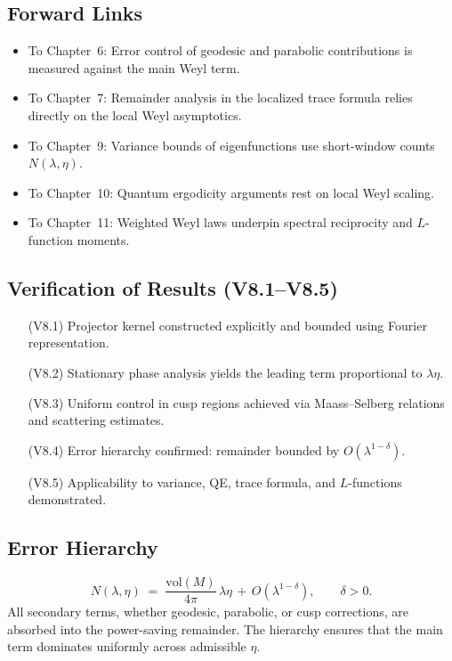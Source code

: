 \subsection*{Forward Links}
\begin{itemize}
  \item To Chapter~6: Error control of geodesic and parabolic contributions is measured against the main Weyl term.
  \item To Chapter~7: Remainder analysis in the localized trace formula relies directly on the local Weyl asymptotics.
  \item To Chapter~9: Variance bounds of eigenfunctions use short-window counts $N(\lambda,\eta)$.
  \item To Chapter~10: Quantum ergodicity arguments rest on local Weyl scaling.
  \item To Chapter~11: Weighted Weyl laws underpin spectral reciprocity and $L$-function moments.
\end{itemize}

\subsection*{Verification of Results (V8.1–V8.5)}
\begin{itemize}
  \item[(V8.1)] Projector kernel constructed explicitly and bounded using Fourier representation.
  \item[(V8.2)] Stationary phase analysis yields the leading term proportional to $\lambda\eta$.
  \item[(V8.3)] Uniform control in cusp regions achieved via Maass–Selberg relations and scattering estimates.
  \item[(V8.4)] Error hierarchy confirmed: remainder bounded by $O(\lambda^{1-\delta})$.
  \item[(V8.5)] Applicability to variance, QE, trace formula, and $L$-functions demonstrated.
\end{itemize}

\subsection*{Error Hierarchy}
\[
  N(\lambda,\eta) \;=\; \frac{\mathrm{vol}(M)}{4\pi}\,\lambda\eta
  \,+\, O(\lambda^{1-\delta}), \qquad \delta>0.
\]
All secondary terms, whether geodesic, parabolic, or cusp corrections, are absorbed into the power-saving remainder.  
The hierarchy ensures that the main term dominates uniformly across admissible $\eta$.

